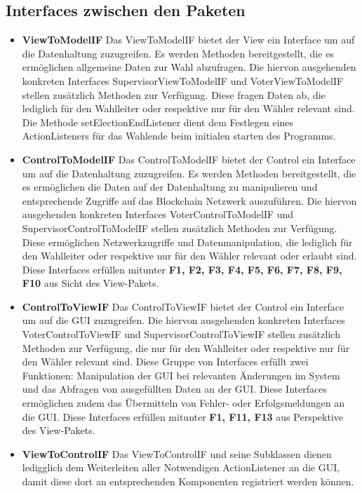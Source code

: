 \documentclass[parskip=full]{scrartcl}
\newcommand{\fakeparagraph}[1]{\textbf{#1}}
\begin{document}
\subsection{Interfaces zwischen den Paketen}
	\begin{itemize}
	\item\fakeparagraph{ViewToModelIF} Das ViewToModelIF bietet der View ein Interface um auf die Datenhaltung zuzugreifen.
	Es werden Methoden bereitgestellt, die es ermöglichen allgemeine Daten zur Wahl abzufragen.
	Die hiervon ausgehenden konkreten Interfaces SupervisorViewToModelIF und VoterViewToModelIF stellen zusätzlich Methoden zur Verfügung. Diese fragen Daten ab, die lediglich für den Wahlleiter oder respektive nur für den Wähler relevant sind.
	Die Methode setElectionEndListener dient dem Festlegen eines ActionListeners für das Wahlende beim initialen starten des Programms.

	\item\fakeparagraph{ControlToModelIF} Das ControlToModelIF bietet der Control ein Interface um auf die Datenhaltung zuzugreifen.
	Es werden Methoden bereitgestellt, die es ermöglichen die Daten auf der Datenhaltung zu manipulieren und entsprechende Zugriffe auf das Blockchain Netzwerk auszuführen.
	Die hiervon ausgehenden konkreten Interfaces VoterControlToModelIF und SupervisorControlToModelIF stellen zusätzlich Methoden zur Verfügung. Diese ermöglichen Netzwerkzugriffe und Datenmanipulation, die lediglich für den Wahlleiter oder respektive nur für den Wähler relevant oder erlaubt sind.
	Diese Interfaces erfüllen mitunter \textbf{F1, F2, F3, F4, F5, F6, F7, F8, F9, F10} aus Sicht des View-Pakets.

	\item\fakeparagraph{ControlToViewIF} Das ControlToViewIF bietet der Control ein Interface um auf die GUI zuzugreifen.
	Die hiervon ausgehenden konkreten Interfaces VoterControlToViewIF und SupervisorControlToViewIF stellen zusätzlich Methoden zur Verfügung, die nur für den Wahlleiter oder respektive nur für den Wähler relevant sind. 
	Diese Gruppe von Interfaces erfüllt zwei Funktionen: Manipulation der GUI bei relevanten Änderungen im System und das Abfragen von ausgefüllten Daten an der GUI.
	Diese Interfaces ermöglichen zudem das Übermitteln von Fehler- oder Erfolgsmeldungen an die GUI.
	Diese Interfaces erfüllen mitunter \textbf{F1, F11, F13} aus Perspektive des View-Pakets.

	\item\fakeparagraph{ViewToControlIF} Das ViewToControlIF und seine Subklassen dienen ledigglich dem Weiterleiten aller Notwendigen ActionListener an die GUI, damit diese dort an entsprechenden Komponenten registriert werden können.


\end{itemize}
\end{document}
